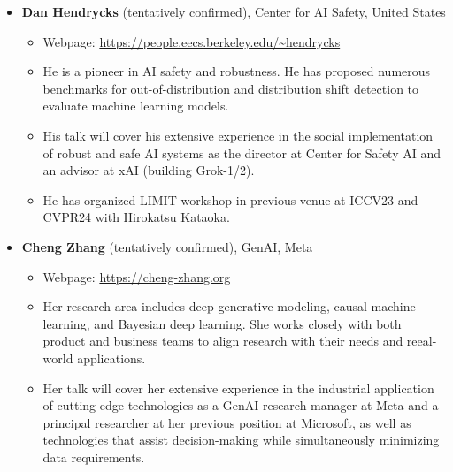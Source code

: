 \documentclass{article}
\begin{document}
\begin{itemize}
    \item {\bf Dan Hendrycks} (tentatively confirmed), Center for AI Safety, United States
    \begin{itemize}
        \item Webpage: \href{https://people.eecs.berkeley.edu/~hendrycks}{\url{https://people.eecs.berkeley.edu/~hendrycks}}
        \item He is a pioneer in AI safety and robustness. He has proposed numerous benchmarks for out-of-distribution and distribution shift detection to evaluate machine learning models.
        \item His talk will cover his extensive experience in the social implementation of robust and safe AI systems as the director at Center for Safety AI and an advisor at xAI (building Grok-1/2).
        \item He has organized LIMIT workshop in previous venue at ICCV23 and CVPR24 with Hirokatsu Kataoka.
    \end{itemize}

    \item {\bf Cheng Zhang} (tentatively confirmed), GenAI, Meta
    \begin{itemize}
        \item Webpage: \href{https://cheng-zhang.org}{\url{https://cheng-zhang.org}}
        \item Her research area includes deep generative modeling, causal machine learning, and Bayesian deep learning. She works closely with both product and business teams to align research with their needs and reeal-world applications.
        \item Her talk will cover her extensive experience in the industrial application of cutting-edge technologies as a GenAI research manager at Meta and a principal researcher at her previous position at Microsoft, as well as technologies that assist decision-making while simultaneously minimizing data requirements.
    \end{itemize}
\end{itemize}
\end{document}
